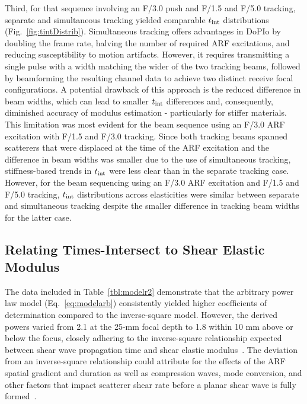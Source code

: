 Third, for that sequence involving an F/3.0 push and F/1.5 and F/5.0 tracking, separate and simultaneous tracking yielded comparable $t_{\textnormal{int}}$ distributions (Fig.~\ref{fig:tintDistrib}). Simultaneous tracking offers advantages in DoPIo by doubling the frame rate, halving the number of required ARF excitations, and reducing susceptibility to motion artifacts. However, it requires transmitting a single pulse with a width matching the wider of the two tracking beams, followed by beamforming the resulting channel data to achieve two distinct receive focal configurations. A potential drawback of this approach is the reduced difference in beam widths, which can lead to smaller $t_{\textnormal{int}}$ differences and, consequently, diminished accuracy of modulus estimation - particularly for stiffer materials. This limitation was most evident for the beam sequence using an F/3.0 ARF excitation with F/1.5 and F/3.0 tracking. Since both tracking beams spanned scatterers that were displaced at the time of the ARF excitation and the difference in beam widths was smaller due to the use of simultaneous tracking, stiffness-based trends in $t_{\textnormal{int}}$ were less clear than in the separate tracking case. However, for the beam sequencing using an F/3.0 ARF excitation and F/1.5 and F/5.0 tracking, $t_{\textnormal{int}}$ distributions across elasticities were similar between separate and simultaneous tracking despite the smaller difference in tracking beam widths for the latter case. 

\subsection{Relating Times-Intersect to Shear Elastic Modulus}

The data included in Table~\ref{tbl:modelr2} demonstrate that the arbitrary power law model (Eq.~\ref{eq:modelarb}) consistently yielded higher coefficients of determination compared to the inverse-square model. However, the derived powers varied from 2.1 at the 25-mm focal depth to 1.8 within 10 mm above or below the focus, closely adhering to the inverse-square relationship expected between shear wave propagation time and shear elastic modulus~\cite{sarvazyan_Shear_1998,palmeri_Ultrasonic_2006}. The deviation from an inverse-square relationship could attribute for the effects of the ARF spatial gradient and duration as well as compression waves, mode conversion, and other factors that impact scatterer shear rate before a planar shear wave is fully formed~\cite{landau_Theory_1986,sarvazyan_Shear_1998,ostrovsky_NonDissipative_2006}.

